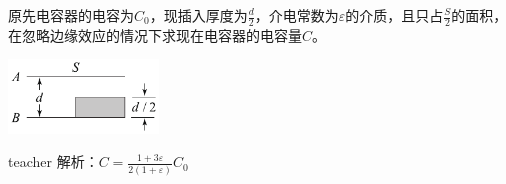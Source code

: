 \begin{example}

原先电容器的电容为$C_0$，现插入厚度为$\frac{d}{2}$，介电常数为$\varepsilon$的介质，且只占$\frac{S}{2}$的面积，在忽略边缘效应的情况下求现在电容器的电容量$C$。
\begin{flushright}
\includegraphics[width = 0.3\textwidth]{images/elec-problem-20.pdf} 
\end{flushright}
\begin{taggedblock}{teacher}
\noindent
解析：$C=\frac{1+3\varepsilon}{2(1+\varepsilon)}C_0$
\end{taggedblock}
\end{example}

%
%
%
%
%
%
%


